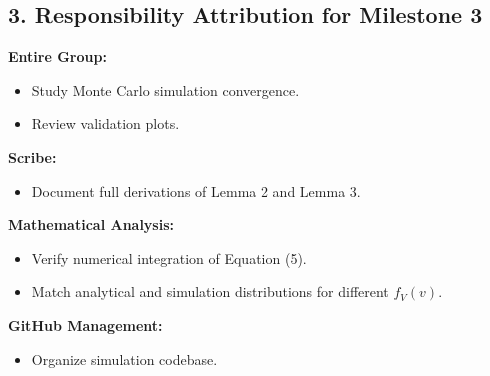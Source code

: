 \documentclass[12pt,a4paper]{article}
\begin{document}
\subsection{3. Responsibility Attribution for Milestone 3}

\textbf{Entire Group:}
\begin{itemize}
    \item Study Monte Carlo simulation convergence.
    \item Review validation plots.
\end{itemize}

\textbf{Scribe:}
\begin{itemize}
    \item Document full derivations of Lemma 2 and Lemma 3.
\end{itemize}

\textbf{Mathematical Analysis:}
\begin{itemize}
    \item Verify numerical integration of Equation (5).
    \item Match analytical and simulation distributions for different $f_V(v)$.
\end{itemize}

\textbf{GitHub Management:}
\begin{itemize}
    \item Organize simulation codebase.
\end{itemize}
\end{document}
